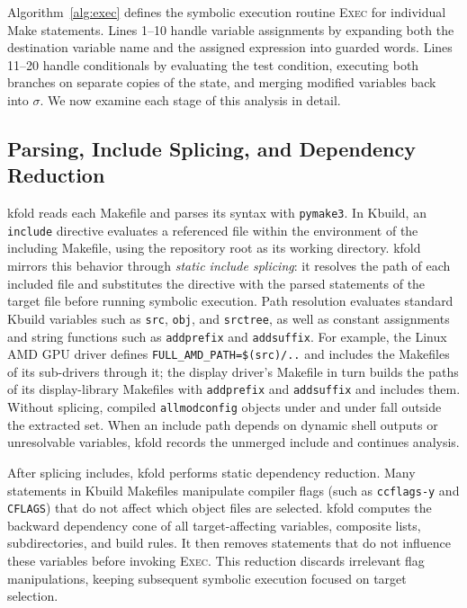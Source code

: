 \documentclass[acmsmall]{acmart}
\newcommand{\tool}{\textsf{kfold}\xspace}
\begin{document}
Algorithm~\ref{alg:exec} defines the symbolic execution routine \textsc{Exec} for individual Make statements.
Lines 1--10 handle variable assignments by expanding both the destination variable name and the assigned expression into guarded words.
Lines 11--20 handle conditionals by evaluating the test condition, executing both branches on separate copies of the state, and merging modified variables back into $\sigma$.
We now examine each stage of this analysis in detail.

\subsection{Parsing, Include Splicing, and Dependency Reduction}\label{sec:technique:include}

\tool reads each Makefile and parses its syntax with \texttt{pymake3}.
In Kbuild, an \texttt{include} directive evaluates a referenced file within the environment of the including Makefile, using the repository root as its working directory.
\tool mirrors this behavior through \emph{static include splicing}: it resolves the path of each included file and substitutes the directive with the parsed statements of the target file before running symbolic execution.
Path resolution evaluates standard Kbuild variables such as \texttt{src}, \texttt{obj}, and \texttt{srctree}, as well as constant assignments and string functions such as \texttt{addprefix} and \texttt{addsuffix}.
For example, the Linux AMD GPU driver defines \texttt{FULL\_AMD\_PATH=\$(src)/..} and includes the Makefiles of its sub-drivers through it; the display driver's Makefile in turn builds the paths of its display-library Makefiles with \texttt{addprefix} and \texttt{addsuffix} and includes them.
Without splicing, \NLinuxNoIncludesAllmodconfigLostAmd compiled \texttt{allmodconfig} objects under  and \NLinuxNoIncludesAllmodconfigLostNouveau under  fall outside the extracted set.
When an include path depends on dynamic shell outputs or unresolvable variables, \tool records the unmerged include and continues analysis.

After splicing includes, \tool performs static dependency reduction.
Many statements in Kbuild Makefiles manipulate compiler flags (such as \texttt{ccflags-y} and \texttt{CFLAGS}) that do not affect which object files are selected.
\tool computes the backward dependency cone of all target-affecting variables, composite lists, subdirectories, and build rules.
It then removes statements that do not influence these variables before invoking \textsc{Exec}.
This reduction discards irrelevant flag manipulations, keeping subsequent symbolic execution focused on target selection.
\end{document}
